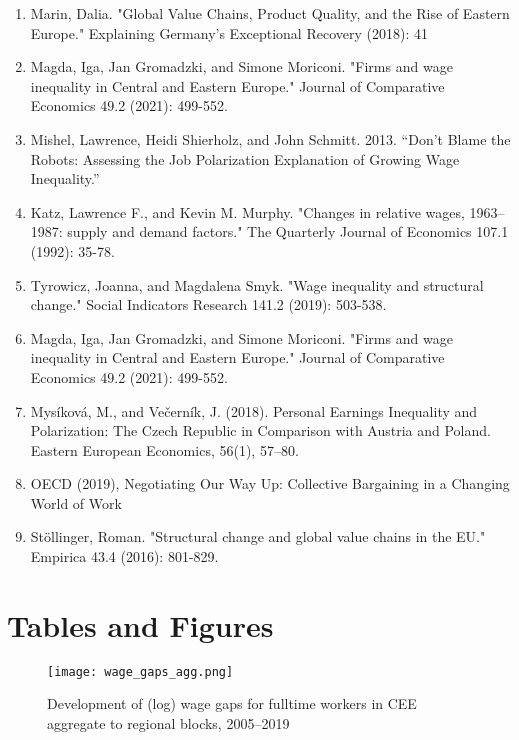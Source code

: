 \documentclass{article}
\begin{document}
\begin{enumerate}
\item Marin, Dalia. "Global Value Chains, Product Quality, and the Rise of Eastern Europe." Explaining Germany’s Exceptional Recovery (2018): 41

\item Magda, Iga, Jan Gromadzki, and Simone Moriconi. "Firms and wage inequality in Central and Eastern Europe." Journal of Comparative Economics 49.2 (2021): 499-552.

\item Mishel, Lawrence, Heidi Shierholz, and John Schmitt. 2013. “Don’t Blame the Robots: Assessing the Job Polarization Explanation of Growing Wage Inequality.”

\item Katz, Lawrence F., and Kevin M. Murphy. "Changes in relative wages, 1963–1987: supply and demand factors." The Quarterly Journal of Economics 107.1 (1992): 35-78.

\item Tyrowicz, Joanna, and Magdalena Smyk. "Wage inequality and structural change." Social Indicators Research 141.2 (2019): 503-538.

\item Magda, Iga, Jan Gromadzki, and Simone Moriconi. "Firms and wage inequality in Central and Eastern Europe." Journal of Comparative Economics 49.2 (2021): 499-552.

\item Mysíková, M., and Večerník, J. (2018). Personal Earnings Inequality and Polarization: The Czech Republic in Comparison with Austria and Poland. Eastern European Economics, 56(1), 57–80.

\item OECD (2019), Negotiating Our Way Up: Collective Bargaining in a Changing World of Work

\item Stöllinger, Roman. "Structural change and global value chains in the EU." Empirica 43.4 (2016): 801-829.

\end{enumerate}
\section{Tables and Figures}


\begin{figure}[!htbp]%
    \centering
    {\texttt{[image: wage\_gaps\_agg.png]} }
    \caption{Development of (log) wage gaps for fulltime workers in CEE aggregate to regional blocks,  2005–2019}
    \label{agg_wage_gaps_CEE}
\end{figure}
\end{document}
